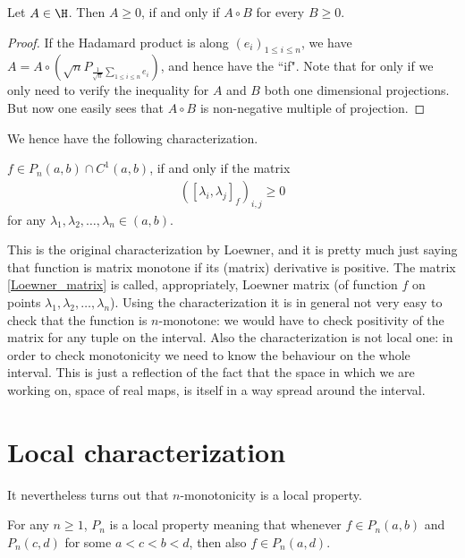 \begin{lem}
	Let $A \in \H$. Then $A \geq 0$, if and only if $A \circ B$ for every $B \geq 0$.
\end{lem}

\begin{proof}
	If the Hadamard product is along $(e_{i})_{1 \leq i \leq n}$, we have $A = A \circ \left(\sqrt{n} P_{\frac{1}{\sqrt{n}}\sum_{1 \leq i \leq n} e_{i}} \right)$, and hence have the ``if". Note that for only if we only need to verify the inequality for $A$ and $B$ both one dimensional projections. But now one easily sees that $A \circ B$ is non-negative multiple of projection.
\end{proof}

We hence have the following characterization.

\begin{lause}\label{loewner_char}
	$f \in P_{n}(a, b) \cap C^{1}(a, b)$, if and only if the matrix
	\begin{align}\label{Loewner_matrix}
		\left([\lambda_{i}, \lambda_{j}]_{f}\right)_{i, j} \geq 0
	\end{align}
	for any $\lambda_{1}, \lambda_{2}, \ldots, \lambda_{n} \in (a, b)$.
\end{lause}

This is the original characterization by Loewner, and it is pretty much just saying that function is matrix monotone if its (matrix) derivative is positive. The matrix \ref{Loewner_matrix} is called, appropriately, Loewner matrix (of function $f$ on points $\lambda_{1}, \lambda_{2}, \ldots, \lambda_{n}$). Using the characterization it is in general not very easy to check that the function is $n$-monotone: we would have to check positivity of the matrix for any tuple on the interval. Also the characterization is not local one: in order to check monotonicity we need to know the behaviour on the whole interval. This is just a reflection of the fact that the space in which we are working on, space of real maps, is itself in a way spread around the interval.

\section{Local characterization}

It nevertheless turns out that $n$-monotonicity is a local property.

\begin{prop}
	For any $n \geq 1$, $P_{n}$ is a local property meaning that whenever $f \in P_{n}(a, b)$ and $P_{n}(c, d)$ for some $a < c < b < d$, then also $f \in P_{n}(a, d)$.
\end{prop}

